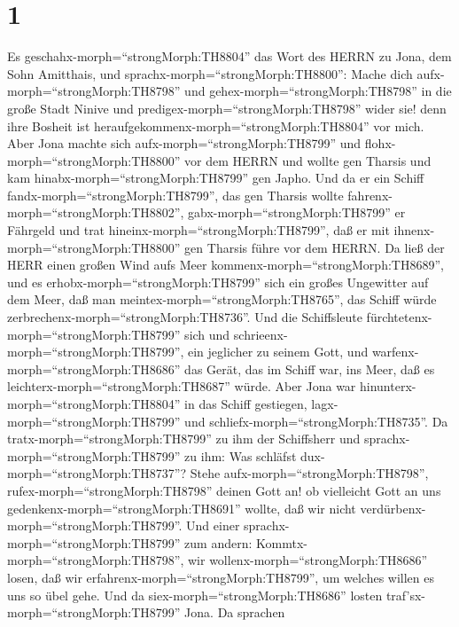 \hypertarget{section}{%
\section{1}\label{section}}

 Es geschahx-morph=``strongMorph:TH8804'' das Wort des HERRN
zu Jona, dem Sohn Amitthais, und sprachx-morph=``strongMorph:TH8800'':
 Mache dich aufx-morph=``strongMorph:TH8798'' und
gehex-morph=``strongMorph:TH8798'' in die große Stadt Ninive und
predigex-morph=``strongMorph:TH8798'' wider sie! denn ihre Bosheit ist
heraufgekommenx-morph=``strongMorph:TH8804'' vor mich.  Aber
Jona machte sich aufx-morph=``strongMorph:TH8799'' und
flohx-morph=``strongMorph:TH8800'' vor dem HERRN und wollte gen Tharsis
und kam hinabx-morph=``strongMorph:TH8799'' gen Japho. Und da er ein
Schiff fandx-morph=``strongMorph:TH8799'', das gen Tharsis wollte
fahrenx-morph=``strongMorph:TH8802'', gabx-morph=``strongMorph:TH8799''
er Fährgeld und trat hineinx-morph=``strongMorph:TH8799'', daß er mit
ihnenx-morph=``strongMorph:TH8800'' gen Tharsis führe vor dem HERRN.
 Da ließ der HERR einen großen Wind aufs Meer
kommenx-morph=``strongMorph:TH8689'', und es
erhobx-morph=``strongMorph:TH8799'' sich ein großes Ungewitter auf dem
Meer, daß man meintex-morph=``strongMorph:TH8765'', das Schiff würde
zerbrechenx-morph=``strongMorph:TH8736''.  Und die
Schiffsleute fürchtetenx-morph=``strongMorph:TH8799'' sich und
schrieenx-morph=``strongMorph:TH8799'', ein jeglicher zu seinem Gott,
und warfenx-morph=``strongMorph:TH8686'' das Gerät, das im Schiff war,
ins Meer, daß es leichterx-morph=``strongMorph:TH8687'' würde. Aber Jona
war hinunterx-morph=``strongMorph:TH8804'' in das Schiff gestiegen,
lagx-morph=``strongMorph:TH8799'' und
schliefx-morph=``strongMorph:TH8735''.  Da
tratx-morph=``strongMorph:TH8799'' zu ihm der Schiffsherr und
sprachx-morph=``strongMorph:TH8799'' zu ihm: Was schläfst
dux-morph=``strongMorph:TH8737''? Stehe
aufx-morph=``strongMorph:TH8798'', rufex-morph=``strongMorph:TH8798''
deinen Gott an! ob vielleicht Gott an uns
gedenkenx-morph=``strongMorph:TH8691'' wollte, daß wir nicht
verdürbenx-morph=``strongMorph:TH8799''.  Und einer
sprachx-morph=``strongMorph:TH8799'' zum andern:
Kommtx-morph=``strongMorph:TH8798'', wir
wollenx-morph=``strongMorph:TH8686'' losen, daß wir
erfahrenx-morph=``strongMorph:TH8799'', um welches willen es uns so übel
gehe. Und da siex-morph=``strongMorph:TH8686'' losten
traf'sx-morph=``strongMorph:TH8799'' Jona.  Da sprachen
